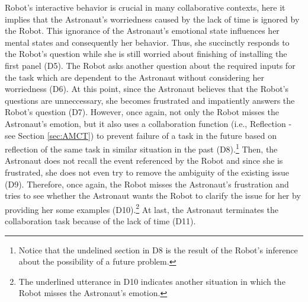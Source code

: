 Robot's interactive behavior is crucial in many collaborative contexts, here it
implies that the Astronaut's worriedness caused by the lack of time is ignored
by the Robot. This ignorance of the Astronaut's emotional state influences her
mental states and consequently her behavior. Thus, she succinctly responds to
the Robot's question while she is still worried about finishing of installing
the first panel (D5). The Robot asks another question about the required inputs
for the task which are dependent to the Astronaut without considering her
worriedness (D6). At this point, since the Astronaut believes that the Robot's
questions are unneccessary, she becomes frustrated and impatiently answers the
Robot's question (D7). However, once again, not only the Robot misses the
Astronaut's emotion, but it also uses a collaboration function (i.e., Reflection
- see Section \ref{sec:AMCT}) to prevent failure of a task in the future based
on reflection of the same task in similar situation in the past
(D8).\footnote{Notice that the undelined section in D8 is the result of the
Robot's inference about the possibility of a future problem.} Then, the
Astronaut does not recall the event referenced by the Robot and since she is
frustrated, she does not even try to remove the ambiguity of the existing issue
(D9). Therefore, once again, the Robot misses the Astronaut's frustration and
tries to see whether the Astronaut wants the Robot to clarify the issue for her
by providing her some examples (D10).\footnote{The underlined utterance in D10
indicates another situation in which the Robot misses the Astronaut's emotion.}
At last, the Astronaut terminates the collaboration task because of the lack of
time (D11).\\

